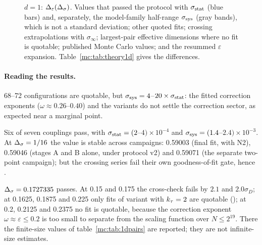 \begin{figure}[htbp]
\caption{$d=1$: $\Delta_\varepsilon(\Delta_\sigma)$. Values that passed the protocol with $\sigma_{\rm stat}$ (blue bars) and, separately, the model-family half-range $\sigma_{\rm sys}$
(gray bands), which is not a standard deviation; other quoted fits; crossing extrapolations with $\sigma_\infty$; largest-pair effective
dimensions where no fit is quotable; published Monte Carlo values; and the resummed $\varepsilon$ expansion. Table~\ref{mc:tab:theory1d} gives the
differences.}\label{mc:fig:1d}
\end{figure}

\paragraph{Reading the results.}
\begin{description}[leftmargin=1.2em]
\item[Near $s\to1$ ($\Ds\le0.05$).] 68--72 configurations are quotable, but $\sigma_{\rm sys}=4$--$20\times\sigma_{\rm stat}$: the fitted correction exponents
 ($\omega\approx0.26$--$0.40$) and the variants do not settle the correction sector, as expected near a marginal point.
\item[Middle ($0.0625\le\Ds\le0.1375$).] Six of seven couplings pass, with $\sigma_{\rm stat}=(2$--$4)\times10^{-4}$ and $\sigma_{\rm sys}=(1.4$--$2.4)\times10^{-3}$. At
 $\Delta_\sigma=1/16$ the value is stable across campaigns: 0.59003 (final fit, with N2), 0.59046 (stages A and B alone, under protocol v2) and 0.59071
 (the separate two-point campaign); but the crossing series fail their own goodness-of-fit gate, hence .
\item[Towards the Gaussian end ($\Ds\ge0.15$).] $\Delta_\sigma=0.1727335$ passes. At 0.15 and 0.175 the cross-check fails by $2.1$ and $2.0\sigma_D$; at
 0.1625, 0.1875 and 0.225 only fits of variant  with $k_\tau=2$ are quotable (); at 0.2, 0.2125 and 0.2375 no fit is
 quotable, because the correction exponent $\omega\approx\varepsilon\le0.2$ is too small to separate from the scaling function over $N\le2^{19}$.
 There the finite-size values of table~\ref{mc:tab:1dpairs} are reported; they are not infinite-size estimates.
\end{description}

